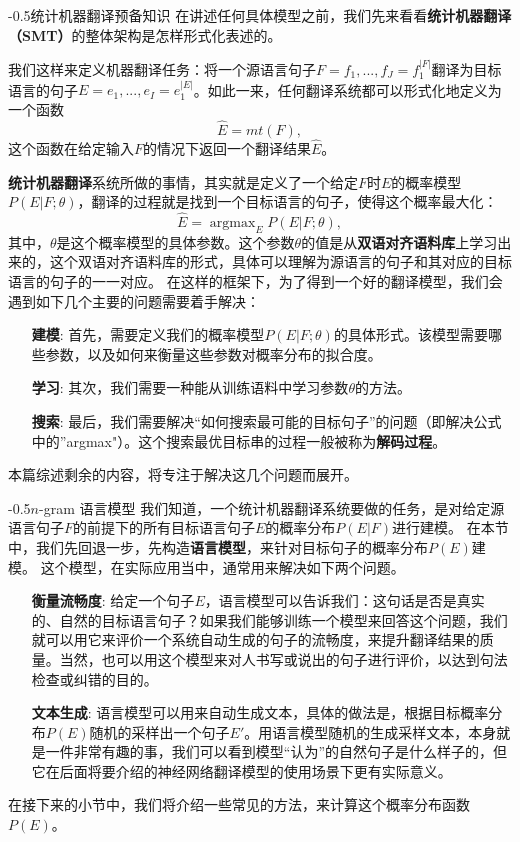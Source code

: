 \documentclass[10pt,a4paper]{ctexart}
\makeatletter
\renewcommand{\section}{\@startsection{section}{1}{0mm}
  {-\baselineskip}{0.5\baselineskip}{\bf\leftline}}
\makeatother
\begin{document}
\section{统计机器翻译预备知识}
在讲述任何具体模型之前，我们先来看看\textbf{统计机器翻译（SMT）}的整体架构是怎样形式化表述的。

我们这样来定义机器翻译任务：将一个源语言句子$F = f_1,...,f_J = f_1^{|F|}$翻译为目标语言的句子$E = e_1,...,e_I = e_1^{|E|}$。如此一来，任何翻译系统都可以形式化地定义为一个函数
\[
  \hat{E} = mt(F),
\]
这个函数在给定输入$F$的情况下返回一个翻译结果$\hat{E}$。

\textbf{统计机器翻译}系统所做的事情，其实就是定义了一个给定$F$时$E$的概率模型$P(E|F;\theta)$，翻译的过程就是找到一个目标语言的句子，使得这个概率最大化：
\[
 \hat{E} = \mathop{\arg\max}_{E} P(E|F;\theta),
\]
其中，$\theta$是这个概率模型的具体参数。这个参数$\theta$的值是从\textbf{双语对齐语料库}上学习出来的，这个双语对齐语料库的形式，具体可以理解为源语言的句子和其对应的目标语言的句子的一一对应。
在这样的框架下，为了得到一个好的翻译模型，我们会遇到如下几个主要的问题需要着手解决：
\begin{enumerate}
\item[\textbf{建模}:] 首先，需要定义我们的概率模型$P(E | F;\theta)$的具体形式。该模型需要哪些参数，以及如何来衡量这些参数对概率分布的拟合度。
\item[\textbf{学习}:] 其次，我们需要一种能从训练语料中学习参数$\theta$的方法。
\item[\textbf{搜索}:] 最后，我们需要解决“如何搜索最可能的目标句子”的问题（即解决公式中的''argmax"）。这个搜索最优目标串的过程一般被称为\textbf{解码过程}。
\end{enumerate}

本篇综述剩余的内容，将专注于解决这几个问题而展开。

\section{$n$-gram 语言模型}
我们知道，一个统计机器翻译系统要做的任务，是对给定源语言句子$F$的前提下的所有目标语言句子$E$的概率分布$P(E | F)$进行建模。
在本节中，我们先回退一步，先构造\textbf{语言模型}，来针对目标句子的概率分布$P(E)$建模。
这个模型，在实际应用当中，通常用来解决如下两个问题。
\begin{enumerate}
\item[\textbf{衡量流畅度}:] 给定一个句子$E$，语言模型可以告诉我们：这句话是否是真实的、自然的目标语言句子？如果我们能够训练一个模型来回答这个问题，我们就可以用它来评价一个系统自动生成的句子的流畅度，来提升翻译结果的质量。当然，也可以用这个模型来对人书写或说出的句子进行评价，以达到句法检查或纠错的目的。
\item[\textbf{文本生成}:] 语言模型可以用来自动生成文本，具体的做法是，根据目标概率分布$P(E)$随机的采样出一个句子$E'$。用语言模型随机的生成采样文本，本身就是一件非常有趣的事，我们可以看到模型“认为”的自然句子是什么样子的，但它在后面将要介绍的神经网络翻译模型的使用场景下更有实际意义。
\end{enumerate}
在接下来的小节中，我们将介绍一些常见的方法，来计算这个概率分布函数$P(E)$。
\end{document}
